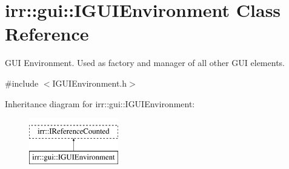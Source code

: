 \hypertarget{classirr_1_1gui_1_1IGUIEnvironment}{}\section{irr\+:\+:gui\+:\+:I\+G\+U\+I\+Environment Class Reference}
\label{classirr_1_1gui_1_1IGUIEnvironment}


G\+UI Environment. Used as factory and manager of all other G\+UI elements.  




{\ttfamily \#include $<$I\+G\+U\+I\+Environment.\+h$>$}

Inheritance diagram for irr\+:\+:gui\+:\+:I\+G\+U\+I\+Environment\+:\begin{figure}[H]
\begin{center}
\leavevmode
\includegraphics[height=2.000000cm]{classirr_1_1gui_1_1IGUIEnvironment}
\end{center}
\end{figure}
